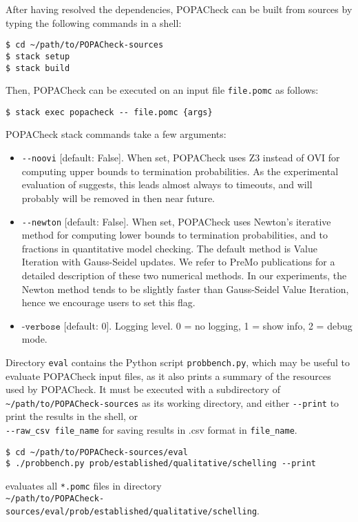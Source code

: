 \documentclass[9pt,a4paper]{article}
\begin{document}
After having resolved the dependencies, POPACheck can be built from sources by typing the following commands in a shell:
\begin{verbatim}
$ cd ~/path/to/POPACheck-sources
$ stack setup
$ stack build
\end{verbatim}
Then, POPACheck can be executed on an input file \verb|file.pomc| as follows:
\begin{verbatim}
$ stack exec popacheck -- file.pomc {args}
\end{verbatim}

POPACheck stack commands take a few arguments:
\begin{itemize}
    \item \verb|--noovi| [default: False]. When set, POPACheck uses Z3 instead of OVI for computing upper bounds to termination probabilities. As the experimental evaluation of \cite{POPACheck} suggests, this leads almost always to timeouts, and will probably will be removed in then near future.
    \item \verb|--newton| [default: False]. When set, POPACheck uses Newton's iterative method for computing lower bounds to termination probabilities, and to fractions in quantitative model checking. The default method is Value Iteration with Gauss-Seidel updates. We refer to PreMo publications \cite{WojtczakE07,Wojtczak09} for a detailed description of these two numerical methods. In our experiments, the Newton method tends to be slightly faster than Gauss-Seidel Value Iteration, hence we encourage users to set this flag.
    \item $\texttt{-verbose}$ [default: 0]. Logging level. 0 = no logging, 1 = show info, 2 = debug mode.
\end{itemize}

Directory \verb|eval| contains the Python script \verb|probbench.py|,
which may be useful to evaluate POPACheck input files, as it also prints
a summary of the resources used by POPACheck.
It must be executed with a subdirectory of \verb|~/path/to/POPACheck-sources| as its working directory, and either \verb|--print| to print the results in the shell, or \\ \verb|--raw_csv file_name| for saving results in .csv format in \verb|file_name|.

\begin{verbatim}
$ cd ~/path/to/POPACheck-sources/eval
$ ./probbench.py prob/established/qualitative/schelling --print
\end{verbatim}
evaluates all \verb|*.pomc| files in directory \\ \verb|~/path/to/POPACheck-sources/eval/prob/established/qualitative/schelling|.
\end{document}
